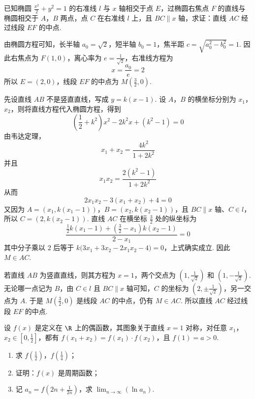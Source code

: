 \begin{problem}
已知椭圆 \(\frac{x^{2}}{2} + y^{2} = 1\) 的右准线 \(l\) 与 \(x\) 轴相交于点 \(E\)，过椭圆右焦点 \(F\) 的直线与椭圆相交于 \(A\)，\(B\) 两点，点 \(C\) 在右准线 \(l\) 上，且 \(BC \parallel x\) 轴，求证：直线 \(AC\) 经过线段 \(EF\) 的中点.
\end{problem}

\begin{solution}
由椭圆方程可知，长半轴 \(a_0=\sqrt{2}\)，短半轴 \(b_0=1\)，焦半距 \(c=\sqrt{a_0^2-b_0^2}=1\). 因此右焦点为 \(F(1,0)\)，离心率为 \(e=\frac{1}{\sqrt{2}}\)，右准线方程为
\[
x=\frac{a_0}{e}=2
\]
所以 \(E=(2,0)\)，线段 \(EF\) 的中点为 \(M\left(\frac{3}{2},0\right)\).

先设直线 \(AB\) 不是竖直直线，写成 \(y=k(x-1)\). 设 \(A\)，\(B\) 的横坐标分别为 \(x_1\)，\(x_2\)，则将直线方程代入椭圆方程，得到
\[
\left(\frac{1}{2}+k^2\right)x^2-2k^2x+(k^2-1)=0
\]
由韦达定理，
\[
x_1+x_2=\frac{4k^2}{1+2k^2}
\]
并且
\[
x_1x_2=\frac{2(k^2-1)}{1+2k^2}
\]
从而
\[
2x_1x_2-3(x_1+x_2)+4=0
\]
又因为 \(A=(x_1,k(x_1-1))\)，\(B=(x_2,k(x_2-1))\)，且 \(BC\parallel x\) 轴、\(C\in l\)，所以 \(C=(2,k(x_2-1))\). 直线 \(AC\) 在横坐标 \(\frac{3}{2}\) 处的纵坐标为
\[
\frac{\frac{1}{2}k(x_1-1)+\left(\frac{3}{2}-x_1\right)k(x_2-1)}{2-x_1}=0
\]
其中分子乘以 \(2\) 后等于 \(k\bigl(3x_1+3x_2-2x_1x_2-4\bigr)=0\)，上式确实成立. 因此 \(M\in AC\).

若直线 \(AB\) 为竖直直线，则其方程为 \(x=1\)，两个交点为 \(\left(1,\frac{1}{\sqrt{2}}\right)\) 和 \(\left(1,-\frac{1}{\sqrt{2}}\right)\). 无论哪一点记为 \(B\)，由 \(C\in l\) 且 \(BC\parallel x\) 轴可知，\(C\) 的坐标为 \(\left(2,\pm\frac{1}{\sqrt{2}}\right)\)，另一交点为 \(A\). 于是 \(M\left(\frac{3}{2},0\right)\) 是线段 \(AC\) 的中点，仍有 \(M\in AC\). 所以直线 \(AC\) 经过线段 \(EF\) 的中点.
\end{solution}

\begin{problem}
设 \(f(x)\) 是定义在 \(\R\) 上的偶函数，其图象关于直线 \(x = 1\) 对称，对任意 \(x_{1}\)，\(x_{2} \in \left[0, \frac{1}{2}\right]\)，都有 \(f(x_{1} + x_{2}) = f(x_{1}) \cdot f(x_{2})\)，且 \(f(1) = a > 0\).

\begin{enumerate}
\item 求 \(f\left(\frac{1}{2}\right)\)，\(f\left(\frac{1}{4}\right)\)；
\item 证明：\(f(x)\) 是周期函数；
\item 记 \(a_{n} = f\left(2n + \frac{1}{2n}\right)\)，求 \(\displaystyle\lim_{n \to \infty}(\ln a_{n})\).
\end{enumerate}
\end{problem}

